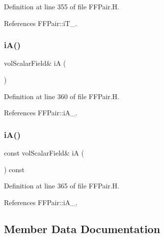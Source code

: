 Definition at line 355 of file F\+F\+Pair.\+H.



References F\+F\+Pair\+::i\+T\+\_\+.

\mbox{\label{classFoam_1_1FFPair_ab93f707da22a77ddd3f7f4ac35632294}} 
\subsubsection{\texorpdfstring{i\+A()}{iA()}\hspace{0.1cm}{\footnotesize\ttfamily [1/2]}}
{\footnotesize\ttfamily vol\+Scalar\+Field\& iA (\begin{DoxyParamCaption}{ }\end{DoxyParamCaption})\hspace{0.3cm}{\ttfamily [inline]}}



Definition at line 360 of file F\+F\+Pair.\+H.



References F\+F\+Pair\+::i\+A\+\_\+.

\mbox{\label{classFoam_1_1FFPair_ae2c1c1e4f41f42a4dd77007cb706089c}} 
\subsubsection{\texorpdfstring{i\+A()}{iA()}\hspace{0.1cm}{\footnotesize\ttfamily [2/2]}}
{\footnotesize\ttfamily const vol\+Scalar\+Field\& iA (\begin{DoxyParamCaption}{ }\end{DoxyParamCaption}) const\hspace{0.3cm}{\ttfamily [inline]}}



Definition at line 365 of file F\+F\+Pair.\+H.



References F\+F\+Pair\+::i\+A\+\_\+.



\subsection{Member Data Documentation}
\mbox{\label{classFoam_1_1FFPair_a23edeeeecebcef11921a33dd5d990570}} 
